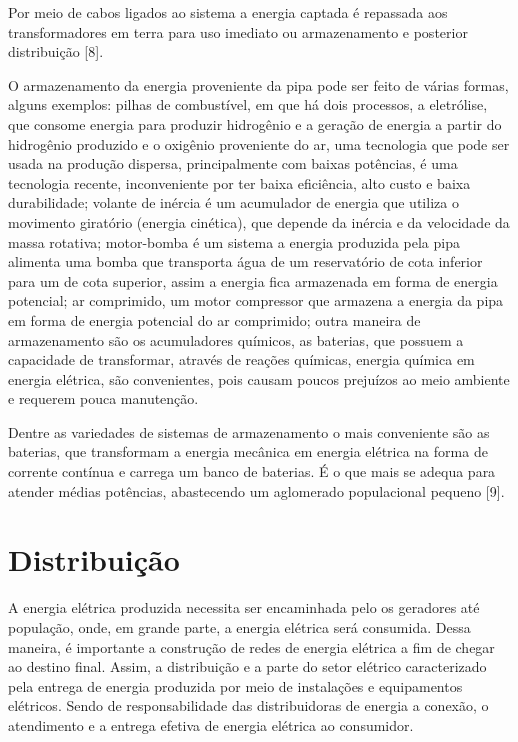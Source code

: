 Por meio de cabos ligados ao sistema a energia captada é repassada aos transformadores em terra para uso imediato ou armazenamento e posterior distribuição [8].

O armazenamento da energia proveniente da pipa pode ser feito de várias formas, alguns exemplos: pilhas de combustível, em que há dois processos, a eletrólise, que consome energia para produzir hidrogênio e a geração de energia a partir do hidrogênio produzido e o oxigênio proveniente do ar, uma tecnologia que pode ser usada na produção dispersa, principalmente com baixas potências, é uma tecnologia recente, inconveniente por ter baixa eficiência, alto custo e baixa durabilidade; volante de inércia é um acumulador de energia que utiliza o movimento giratório (energia cinética), que depende da inércia e da velocidade da massa rotativa; motor-bomba é um sistema a energia produzida pela pipa alimenta uma bomba que transporta água de um reservatório de cota inferior para um de cota superior, assim a energia fica armazenada em forma de energia potencial; ar comprimido, um motor compressor que armazena a energia da pipa em forma de energia potencial do ar comprimido; outra maneira de armazenamento são os acumuladores químicos, as baterias, que possuem a capacidade de transformar, através de reações químicas, energia química em energia elétrica, são convenientes, pois causam poucos prejuízos ao meio ambiente e requerem pouca manutenção.  

Dentre as variedades de sistemas de armazenamento o mais conveniente são as baterias, que transformam a energia mecânica em energia elétrica na forma de corrente contínua e carrega um banco de baterias. É o que mais se adequa para atender médias potências, abastecendo um aglomerado populacional pequeno [9]. 


\section{Distribuição}

A energia elétrica produzida necessita ser encaminhada pelo os geradores até população, onde, em grande parte, a energia elétrica será consumida. Dessa maneira, é importante a construção de redes de energia elétrica a fim de chegar ao destino final. Assim, a distribuição e a parte do setor elétrico caracterizado pela entrega de energia produzida por meio de instalações e equipamentos elétricos. Sendo de responsabilidade das distribuidoras de energia a conexão, o atendimento e a entrega efetiva de energia elétrica ao consumidor. 

